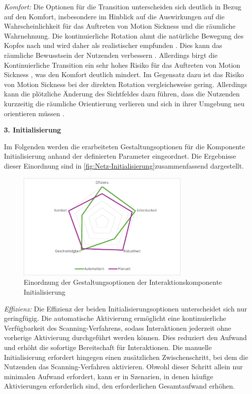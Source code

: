 \textit{Komfort:}
Die Optionen für die Transition unterscheiden sich deutlich in Bezug auf den Komfort, insbesondere im Hinblick auf die Auswirkungen auf die Wahrscheinlichkeit für das Auftreten von Motion Sickness und die räumliche Wahrnehmung.
Die kontinuierliche Rotation ahmt die natürliche Bewegung des Kopfes nach und wird daher als realistischer empfunden \citep{8797722}. Dies kann das räumliche Bewusstsein der Nutzenden verbessern \citep{10.1145/3441852.3471230}. Allerdings birgt die Kontinuierliche Transition ein sehr hohes Risiko für das Auftreten von Motion Sickness \citep{10.1007/s10055-020-00425-x, 8797722}, was den Komfort deutlich mindert.
Im Gegensatz dazu ist das Risiko von Motion Sickness bei der direkten Rotation vergleichsweise gering. Allerdings kann die plötzliche Änderung des Sichtfeldes dazu führen, dass die Nutzenden kurzzeitig die räumliche Orientierung verlieren und sich in ihrer Umgebung neu orientieren müssen \citep{10.1145/3441852.3471230}. 

\textbf{3. Initialisierung} 

Im Folgenden werden die erarbeiteten Gestaltungsoptionen für die Komponente Initialisierung anhand der definierten Parameter eingeordnet. Die Ergebnisse dieser Einordnung sind in \autoref{fig:Netz-Initialisierung}zusammenfassend dargestellt. 

\begin{figure}[tbh]
    \centering
    \includegraphics[width=0.75\textwidth]{images/Netzdiagramm-Initialisierung.png}
    \caption{Einordnung der Gestaltungsoptionen der Interaktionskomponente Initialisierung}
    \label{fig:Netz-Initialisierung}
\end{figure}

\textit{Effizienz:}
Die Effizienz der beiden Initialisierungsoptionen unterscheidet sich nur geringfügig. Die automatische Aktivierung ermöglicht eine kontinuierliche Verfügbarkeit des Scanning-Verfahrens, sodass Interaktionen jederzeit ohne vorherige Aktivierung durchgeführt werden können. Dies reduziert den Aufwand und erhöht die sofortige Bereitschaft für Interaktionen. Die manuelle Initialisierung erfordert hingegen einen zusätzlichen Zwischenschritt, bei dem die Nutzenden das Scanning-Verfahren aktivieren. Obwohl dieser Schritt allein nur minimalen Aufwand erfordert, kann er in Szenarien, in denen häufige Aktivierungen erforderlich sind, den erforderlichen Gesamtaufwand erhöhen. 

